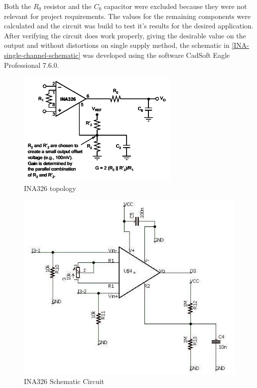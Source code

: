 Both the $R_0$ resistor and the $C_0$ capacitor were excluded because they were not
relevant for project requirements. The values for the remaining components were calculated
and the circuit was build to test it's results for the desired application.
After verifying the circuit does work properly, giving the desirable value on the output and without
distortions on single supply method, the schematic in \autoref{INA-single-channel-schematic} was
developed using the software CadSoft Eagle Professional 7.6.0.
\begin{figure}[!htpb]
  \centering
  \caption{INA326 topology}
  \label{INA_topology}
  \includegraphics[scale=0.7]{images/INA/datasheet}
\end{figure}

\begin{figure}[!htpb]
  \centering
  \caption{INA326 Schematic Circuit}
  \label{INA-single-channel-schematic}
  \includegraphics[scale=0.65]{images/INA/single-channel-schematic}
\end{figure}


